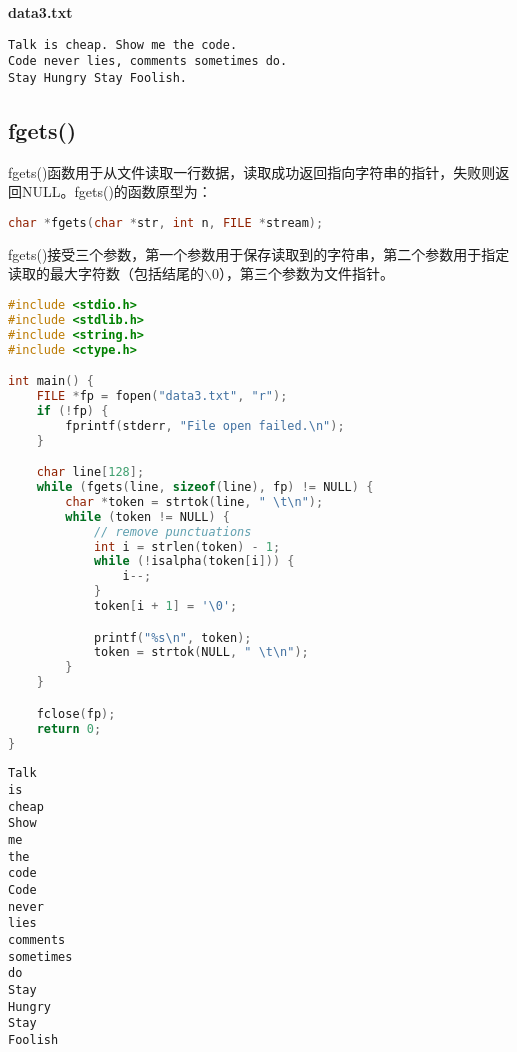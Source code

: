 \begin{tcolorbox}
    \textbf{data3.txt}
    \begin{verbatim}
Talk is cheap. Show me the code.
Code never lies, comments sometimes do.
Stay Hungry Stay Foolish.
	\end{verbatim}
\end{tcolorbox}

\vspace{0.5cm}

\subsection{fgets()}

fgets()函数用于从文件读取一行数据，读取成功返回指向字符串的指针，失败则返回NULL。fgets()的函数原型为：

\vspace{-0.5cm}

\begin{lstlisting}[language=C++]
char *fgets(char *str, int n, FILE *stream);
\end{lstlisting}

fgets()接受三个参数，第一个参数用于保存读取到的字符串，第二个参数用于指定读取的最大字符数（包括结尾的$ \backslash $0），第三个参数为文件指针。\\


\begin{lstlisting}[language=C++]
#include <stdio.h>
#include <stdlib.h>
#include <string.h>
#include <ctype.h>

int main() {
    FILE *fp = fopen("data3.txt", "r");
    if (!fp) {
        fprintf(stderr, "File open failed.\n");
    }

    char line[128];
    while (fgets(line, sizeof(line), fp) != NULL) {
        char *token = strtok(line, " \t\n");
        while (token != NULL) {
            // remove punctuations
            int i = strlen(token) - 1;
            while (!isalpha(token[i])) {
                i--;
            }
            token[i + 1] = '\0';

            printf("%s\n", token);
            token = strtok(NULL, " \t\n");
        }
    }

    fclose(fp);
    return 0;
}
\end{lstlisting}

\begin{tcolorbox}
    \begin{verbatim}
Talk
is
cheap
Show
me
the
code
Code
never
lies
comments
sometimes
do
Stay
Hungry
Stay
Foolish
	\end{verbatim}
\end{tcolorbox}

\newpage